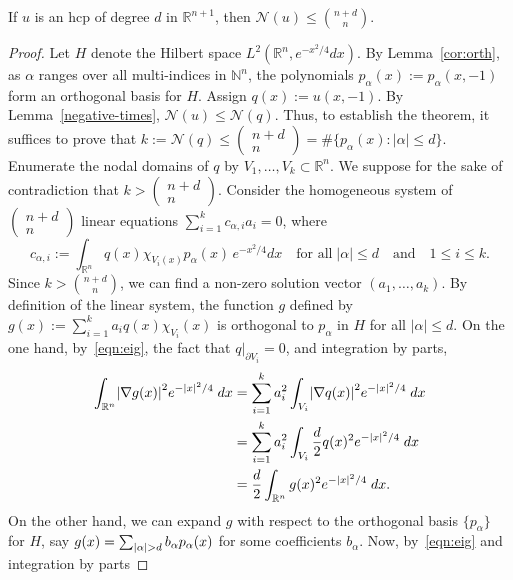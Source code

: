 \documentclass[AHL,Unicode,longabstracts,published]{cedram}
\newcommand{\N}{\mathbb{N}}
\newcommand{\R}{\mathbb{R}}
\newcommand{\abs}[1]{\left \lvert #1 \right \rvert}
\newcommand{\nodal}{\mathcal{N}}
\let\originalleft\left
\let\originalright\right
\renewcommand{\left}{\mathopen{}\mathclose\bgroup\originalleft}
\renewcommand{\right}{\aftergroup\egroup\originalright}
\newcommand{\R}{\mathbb{R}}
\begin{document}
\begin{theo}\label{thm:courant}
If $u$ is an hcp of degree $d$ in $\R^{n+1}$, then $\nodal(u) \le \binom{n+d}{n}$.
\end{theo}

\begin{proof}
Let $H$ denote the Hilbert space $L^2(\R^n,e^{-x^2/4}dx)$. By Lemma~\ref{cor:orth}, as $\alpha$ ranges over all multi-indices in $\N^n$, the polynomials $p_\alpha(x):=p_\alpha(x,-1)$ form an orthogonal basis for $H$. Assign $q(x):=u(x,-1)$. By Lemma~\ref{negative-times}, $\nodal(u)\leq\nodal(q)$. Thus, to establish the theorem, it suffices to prove that $k:=\nodal(q)\leq (
\begin{smallmatrix}n+d\\n
\end{smallmatrix})=\#\{p_\alpha(x):|\alpha|\leq d\}$. Enumerate the nodal domains of $q$ by $V_1, \dots, V_k \subset \R^n$. We suppose for the sake of contradiction that $k>(
\begin{smallmatrix}n+d\\n
\end{smallmatrix})$. Consider the homogeneous system of $(
\begin{smallmatrix}n+d\\n
\end{smallmatrix})$ linear equations $\sum_{i=1}^k c_{\alpha,i}a_i=0$, where
\[
c_{\alpha,i}:=\int_{\R^n} q(x)\chi_{V_i(x)} p_\alpha(x)\,e^{-x^2/4}dx\quad\text{for all} \;|\alpha|\leq d\quad \text{and} \quad 1\leq i\leq k.
\]
Since $k>\binom{n+d}{n}$, we can find a non-zero solution vector $(a_1,\dots,a_k)$. By definition of the linear system, the function $g$ defined by $g(x):=\sum_{i=1}^k a_iq(x)\chi_{V_i}(x)$ is orthogonal to $p_\alpha$ in $H$ for all $|\alpha|\leq d$. On the one hand, by~\eqref{eqn:eig}, {the fact that $q|_{\partial V_i} = 0$}, and integration by parts,
\begin{equation}\label{eqn:eigp}
\begin{aligned}[t]
\int_{\R^n} \abs{\nabla g(x)}^2 e^{-\abs{x}^2/4} \; dx &= \sum_{i=1}^k a_i^2 \int_{V_i} \abs{\nabla q(x)}^2 e^{-\abs{x}^2/4} \; dx\\
&= \sum_{i=1}^k a_i^2 \int_{V_i} \frac{d}{2} q(x)^2 e^{-\abs{x}^2/4} \; dx\\
&= \frac{d}{2} \int_{\R^n} g(x)^2 e^{-\abs{x}^2/4} \; dx.
\end{aligned}
\end{equation}
On the other hand, we can expand $g$ with respect to the orthogonal basis $\{p_\alpha\}$ for $H$, say $g(x) = \sum_{\abs{\alpha} > d} b_\alpha p_\alpha(x)$ for some coefficients $b_\alpha$. Now, by~\eqref{eqn:eig} and integration by parts

\end{proof}
\end{document}
